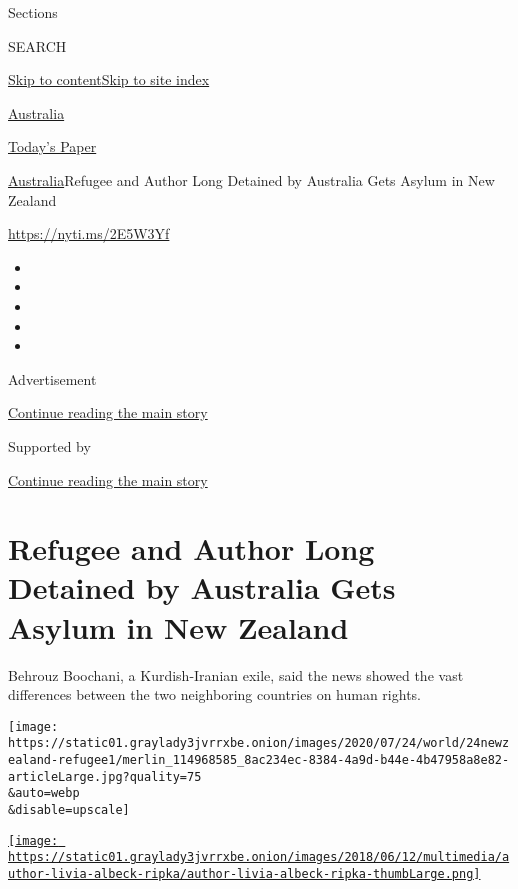 Sections

SEARCH

\protect\hyperlink{site-content}{Skip to
content}\protect\hyperlink{site-index}{Skip to site index}

\href{https://www.nytimes3xbfgragh.onion/section/world/australia}{Australia}

\href{https://myaccount.nytimes3xbfgragh.onion/auth/login?response_type=cookie\&client_id=vi}{}

\href{https://www.nytimes3xbfgragh.onion/section/todayspaper}{Today's
Paper}

\href{/section/world/australia}{Australia}\textbar{}Refugee and Author
Long Detained by Australia Gets Asylum in New Zealand

\href{https://nyti.ms/2E5W3Yf}{https://nyti.ms/2E5W3Yf}

\begin{itemize}
\item
\item
\item
\item
\item
\end{itemize}

Advertisement

\protect\hyperlink{after-top}{Continue reading the main story}

Supported by

\protect\hyperlink{after-sponsor}{Continue reading the main story}

\hypertarget{refugee-and-author-long-detained-by-australia-gets-asylum-in-new-zealand}{%
\section{Refugee and Author Long Detained by Australia Gets Asylum in
New
Zealand}\label{refugee-and-author-long-detained-by-australia-gets-asylum-in-new-zealand}}

Behrouz Boochani, a Kurdish-Iranian exile, said the news showed the vast
differences between the two neighboring countries on human rights.

\texttt{[image: https://static01.graylady3jvrrxbe.onion/images/2020/07/24/world/24newzealand-refugee1/merlin\_114968585\_8ac234ec-8384-4a9d-b44e-4b47958a8e82-articleLarge.jpg?quality=75\\\&auto=webp\\\&disable=upscale]}

\href{https://www.nytimes3xbfgragh.onion/by/livia-albeck-ripka}{\texttt{[image: https://static01.graylady3jvrrxbe.onion/images/2018/06/12/multimedia/author-livia-albeck-ripka/author-livia-albeck-ripka-thumbLarge.png]}}

